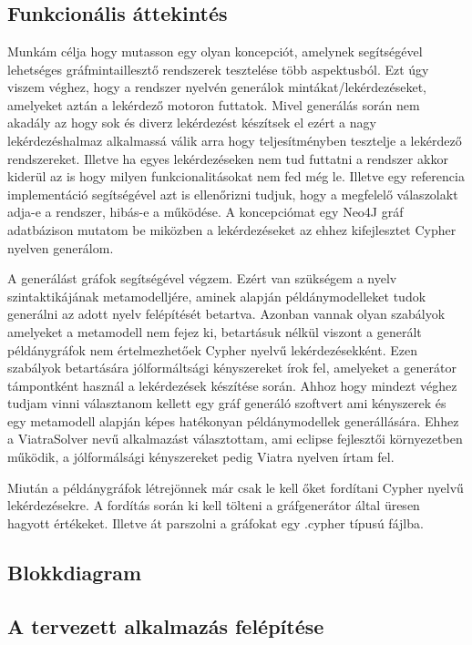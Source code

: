 \chapter{\attekintes}

\section{Funkcionális áttekintés}

Munkám célja hogy mutasson egy olyan koncepciót, amelynek segítségével lehetséges gráfmintaillesztő
 rendszerek tesztelése több aspektusból. Ezt úgy viszem véghez, hogy a rendszer nyelvén generálok
 mintákat/lekérdezéseket, amelyeket aztán a lekérdező motoron futtatok. Mivel generálás során nem 
 akadály az hogy sok és diverz lekérdezést készítsek el ezért a nagy lekérdezéshalmaz alkalmassá válik
 arra hogy teljesítményben tesztelje a lekérdező rendszereket. Illetve ha egyes lekérdezéseken nem tud
 futtatni a rendszer akkor kiderül az is hogy milyen funkcionalitásokat nem fed még le. Illetve egy 
 referencia implementáció segítségével azt is ellenőrizni tudjuk, hogy a megfelelő válaszolakt adja-e
 a rendszer, hibás-e a működése. A koncepciómat egy Neo4J \cite{neo4j} gráf adatbázison mutatom be 
 miközben a lekérdezéseket az ehhez kifejlesztet Cypher \cite{Cypher} nyelven generálom. 
 
A generálást gráfok segítségével végzem. Ezért van szükségem a nyelv szintaktikájának metamodelljére,
aminek alapján példánymodelleket tudok generálni az adott nyelv felépítését betartva. Azonban vannak 
olyan szabályok amelyeket a metamodell nem fejez ki, betartásuk nélkül viszont a generált példánygráfok
nem értelmezhetőek Cypher nyelvű lekérdezésekként. Ezen szabályok betartására jólformáltsági kényszereket 
írok fel, amelyeket a generátor támpontként használ a lekérdezések készítése során. Ahhoz hogy mindezt 
véghez tudjam vinni választanom kellett egy gráf generáló szoftvert ami kényszerek és egy metamodell
alapján képes hatékonyan példánymodellek generállására. Ehhez a ViatraSolver nevű alkalmazást választottam,
ami eclipse fejlesztői környezetben működik, a jólformálsági kényszereket pedig Viatra nyelven írtam fel.

Miután a példánygráfok létrejönnek már csak le kell őket fordítani Cypher nyelvű lekérdezésekre.
A fordítás során ki kell tölteni a gráfgenerátor által üresen hagyott értékeket. Illetve át parszolni a
gráfokat egy .cypher típusú fájlba.  
  

\section{Blokkdiagram}

\section{A tervezett alkalmazás felépítése}